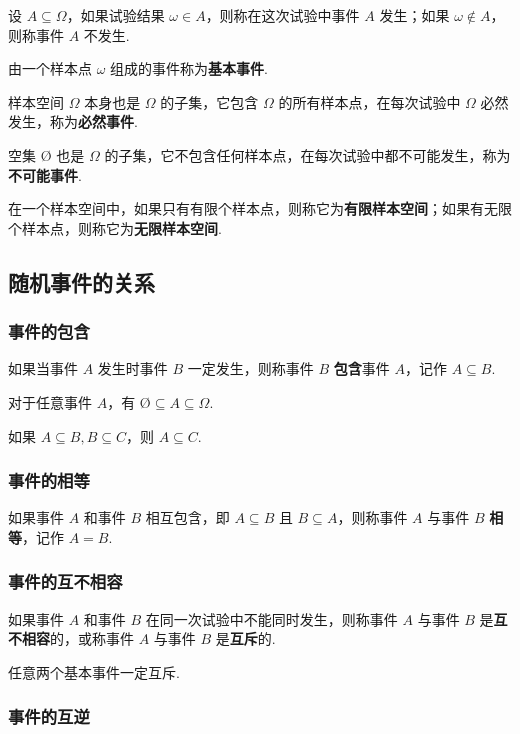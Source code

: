 设 $A \subseteq \varOmega$，如果试验结果 $\omega \in A$，则称在这次试验中事件 $A$ 发生；如果 $\omega \notin A$，则称事件 $A$ 不发生.

由一个样本点 $\omega$ 组成的事件称为\textbf{基本事件}.

样本空间 $\varOmega$ 本身也是 $\varOmega$ 的子集，它包含 $\varOmega$ 的所有样本点，在每次试验中 $\varOmega$ 必然发生，称为\textbf{必然事件}.

空集 $\text{\O}$ 也是 $\varOmega$ 的子集，它不包含任何样本点，在每次试验中都不可能发生，称为\textbf{不可能事件}.

在一个样本空间中，如果只有有限个样本点，则称它为\textbf{有限样本空间}；如果有无限个样本点，则称它为\textbf{无限样本空间}.

\subsection{随机事件的关系}

\subsubsection{事件的包含}

如果当事件 $A$ 发生时事件 $B$ 一定发生，则称事件 $B$ \textbf{包含}事件 $A$，记作 $A \subseteq B$.

对于任意事件 $A$，有 $\text{\O} \subseteq A \subseteq \varOmega$.

如果 $A \subseteq B,B \subseteq C$，则 $A\subseteq C$.

\subsubsection{事件的相等}

如果事件 $A$ 和事件 $B$ 相互包含，即 $A \subseteq B$ 且 $B \subseteq A$，则称事件 $A$ 与事件 $B$ \textbf{相等}，记作 $A=B$.

\subsubsection{事件的互不相容}

如果事件 $A$ 和事件 $B$ 在同一次试验中不能同时发生，则称事件 $A$ 与事件 $B$ 是\textbf{互不相容}的，或称事件 $A$ 与事件 $B$ 是\textbf{互斥}的.

任意两个基本事件一定互斥.

\subsubsection{事件的互逆}


